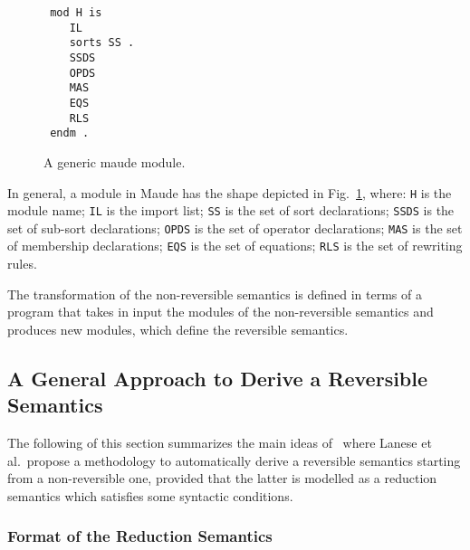 \documentclass{article}[12pt,a4paper]
\theoremstyle{definition}
\begin{document}
\begin{figure}[t]
\begin{verbatim}
 mod H is
    IL
    sorts SS .
    SSDS
    OPDS
    MAS
    EQS
    RLS
 endm .
\end{verbatim}
  
  \caption{A generic maude module.}
  \label{fig:maude-module}
\end{figure}

In general, a module in Maude has the shape depicted in Fig.~\ref{fig:maude-module}, where:
\verb+H+ is the module name; \verb+IL+ is the import list; \verb+SS+ is the set
of sort declarations; \verb+SSDS+ is the set of sub-sort declarations; \verb+OPDS+
is the set of operator declarations; \verb+MAS+ is the set of membership
declarations; \verb+EQS+ is the set of equations; \verb+RLS+ is the set of
rewriting rules. 

The transformation of the non-reversible semantics is defined in terms of a
program that takes in input the modules of the non-reversible semantics and
produces new modules, which define the reversible semantics.


\subsection{A General Approach to Derive a Reversible Semantics}\label{sec:gener-appr-derive-rev-sem}


The following of this section summarizes the main ideas of~\cite{LaneseM20}
where Lanese et al.\ propose a methodology to automatically
derive a reversible semantics starting from a non-reversible one, provided that
the latter is modelled as a reduction semantics which satisfies some syntactic conditions.

\subsubsection{Format of the Reduction Semantics}
\end{document}
